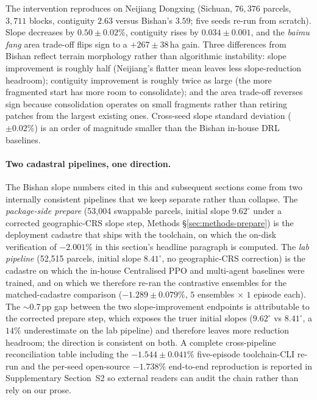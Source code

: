 \documentclass[11pt]{article}
\begin{document}
The intervention reproduces on Neijiang Dongxing (Sichuan, $76{,}376$ parcels, $3{,}711$ blocks, contiguity $2.63$ versus Bishan's $3.59$; five seeds re-run from scratch). Slope decreases by $0.50 \pm 0.02\%$, contiguity rises by $0.034 \pm 0.001$, and the \textit{baimu fang} area trade-off flips sign to a $+267 \pm 38$\,ha gain. Three differences from Bishan reflect terrain morphology rather than algorithmic instability: slope improvement is roughly half (Neijiang's flatter mean leaves less slope-reduction headroom); contiguity improvement is roughly twice as large (the more fragmented start has more room to consolidate); and the area trade-off reverses sign because consolidation operates on small fragments rather than retiring patches from the largest existing ones. Cross-seed slope standard deviation ($\pm 0.02\%$) is an order of magnitude smaller than the Bishan in-house DRL baselines.

\paragraph{Two cadastral pipelines, one direction.} The Bishan slope numbers cited in this and subsequent sections come from two internally consistent pipelines that we keep separate rather than collapse. The \emph{package-side prepare} (53{,}004 swappable parcels, initial slope $9.62^{\circ}$ under a corrected geographic-CRS slope step, Methods \S\ref{sec:methods-prepare}) is the deployment cadastre that ships with the toolchain, on which the on-disk verification of $-2.001\%$ in this section's headline paragraph is computed. The \emph{lab pipeline} (52{,}515 parcels, initial slope $8.41^{\circ}$, no geographic-CRS correction) is the cadastre on which the in-house Centralised PPO and multi-agent baselines were trained, and on which we therefore re-ran the contrastive ensembles for the matched-cadastre comparison ($-1.289 \pm 0.079\%$, $5$ ensembles $\times$ $1$ episode each). The $\sim$0.7\,pp gap between the two slope-improvement endpoints is attributable to the corrected prepare step, which exposes the truer initial slopes ($9.62^{\circ}$ vs $8.41^{\circ}$, a $14\%$ underestimate on the lab pipeline) and therefore leaves more reduction headroom; the direction is consistent on both. A complete cross-pipeline reconciliation table including the $-1.544 \pm 0.041\%$ five-episode toolchain-CLI re-run and the per-seed open-source $-1.738\%$ end-to-end reproduction is reported in Supplementary Section~S2 so external readers can audit the chain rather than rely on our prose.
\end{document}
